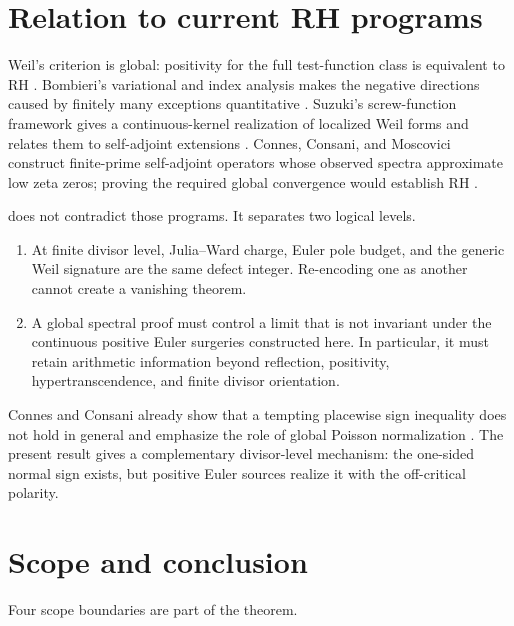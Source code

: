 \documentclass[11pt]{article}
\begin{document}
\section{Relation to current RH programs}

Weil's criterion is global: positivity for the full test-function class is
equivalent to RH \cite{Weil1952}.  Bombieri's variational and index
analysis makes the negative directions caused by finitely many exceptions
quantitative \cite{Bombieri2000,Bombieri2003}.  Suzuki's screw-function
framework gives a continuous-kernel realization of localized Weil forms
and relates them to self-adjoint extensions \cite{Suzuki2026}.
Connes, Consani, and Moscovici construct finite-prime self-adjoint
operators whose observed spectra approximate low zeta zeros; proving the
required global convergence would establish RH \cite{CCM2025}.

 does not contradict those programs.  It separates two
logical levels.

\begin{enumerate}
\item At finite divisor level, Julia--Ward charge, Euler pole budget, and the
      generic Weil signature are the same defect integer.  Re-encoding one
      as another cannot create a vanishing theorem.
\item A global spectral proof must control a limit that is not invariant
      under the continuous positive Euler surgeries constructed here.
      In particular, it must retain arithmetic information beyond
      reflection, positivity, hypertranscendence, and finite divisor
      orientation.
\end{enumerate}

Connes and Consani already show that a tempting placewise sign inequality
does not hold in general and emphasize the role of global Poisson
normalization \cite{ConnesConsani2021}.  The present result gives a
complementary divisor-level mechanism: the one-sided normal sign exists,
but positive Euler sources realize it with the off-critical polarity.

\section{Scope and conclusion}

Four scope boundaries are part of the theorem.
\end{document}

